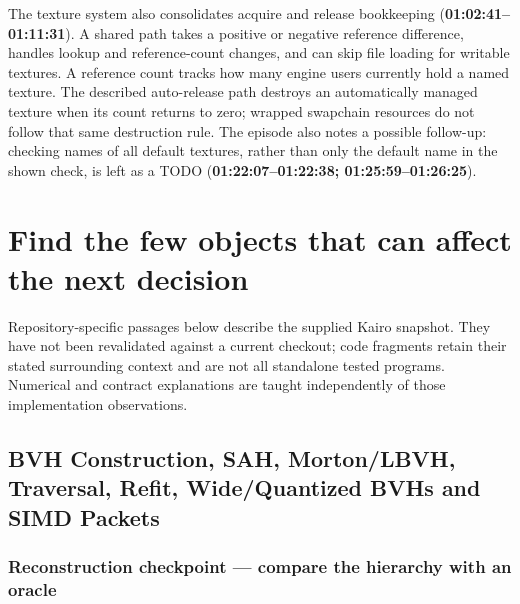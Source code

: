 The texture system also consolidates acquire and release bookkeeping (\textbf{01:02:41--01:11:31}). A shared  path takes a positive or negative reference difference, handles lookup and reference-count changes, and can skip file loading for writable textures. A reference count tracks how many engine users currently hold a named texture. The described auto-release path destroys an automatically managed texture when its count returns to zero; wrapped swapchain resources do not follow that same destruction rule. The episode also notes a possible follow-up: checking names of all default textures, rather than only the default name in the shown check, is left as a TODO (\textbf{01:22:07--01:22:38; 01:25:59--01:26:25}).

\section{Find the few objects that can affect the next decision}\label{06-engine-ii-ch027-find-the-few-objects-that-can-affect-the-next-decision}

\hypertarget{06-engine-ii-ch027-find-the-few-objects-that-can-affect-the-next-decision}{}

Repository-specific passages below describe the supplied Kairo snapshot. They have not been revalidated against a current checkout; code fragments retain their stated surrounding context and are not all standalone tested programs. Numerical and contract explanations are taught independently of those implementation observations.

\subsection{BVH Construction, SAH, Morton/LBVH, Traversal, Refit, Wide/Quantized BVHs and SIMD Packets}\label{06-engine-ii-ch027-bvh-construction-sah-mortonlbvh-traversal-refit-widequantized-bvhs-and-simd-packets}

\hypertarget{06-engine-ii-ch027-bvh-construction-sah-mortonlbvh-traversal-refit-widequantized-bvhs-and-simd-packets}{}

\subsubsection{Reconstruction checkpoint --- compare the hierarchy with an oracle}\label{06-engine-ii-ch027-reconstruction-checkpoint-compare-the-hierarchy-with-an-oracle}

